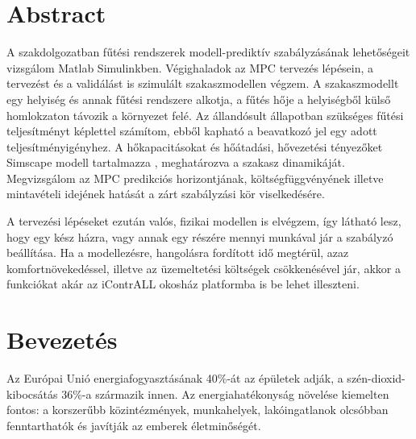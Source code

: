 \chapter*{Abstract}

A szakdolgozatban fűtési rendszerek modell-prediktív szabályzásának lehetőségeit vizsgálom Matlab Simulinkben. %
Végighaladok az MPC tervezés lépésein, a tervezést és a validálást is szimulált szakaszmodellen végzem. A szakaszmodellt egy helyiség és annak fűtési rendszere alkotja, a fűtés hője a helyiségből külső homlokzaton távozik a környezet felé. Az állandósult állapotban szükséges fűtési teljesítményt képlettel számítom, ebből kapható a beavatkozó jel egy adott teljesítményigényhez. A hőkapacitásokat és hőátadási, hővezetési tényezőket Simscape modell tartalmazza%
, meghatározva a szakasz dinamikáját. Megvizsgálom az MPC predikciós horizontjának, költségfüggvényének illetve mintavételi idejének hatását a zárt szabályzási kör viselkedésére.  %

A tervezési lépéseket ezután valós, fizikai modellen is elvégzem, így látható lesz, hogy egy kész házra, vagy annak egy részére mennyi munkával jár a szabályzó beállítása. Ha a modellezésre, hangolásra fordított idő megtérül, azaz komfortnövekedéssel, illetve az üzemeltetési költségek csökkenésével jár, akkor a funkciókat akár az iContrALL okosház platformba is be lehet illeszteni.



\chapter{Bevezetés}

%
%
%



Az Európai Unió energiafogyasztásának 40\%-át az épületek adják, a szén-dioxid-kibocsátás 36\%-a származik innen. Az energiahatékonyság növelése kiemelten fontos: a korszerűbb közintézmények, munkahelyek, lakóingatlanok olcsóbban fenntarthatók és javítják az emberek életminőségét. %

